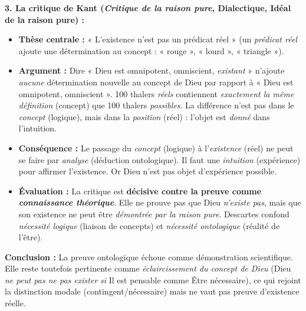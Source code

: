 \documentclass[11pt]{article}
\newcommand{\cle}[1]{{\popxbold\color{popdark}#1}}
\begin{document}
\begin{exoresolu}
\textbf{3. La critique de Kant (\emph{Critique de la raison pure}, Dialectique, Idéal de la raison pure) :}
\begin{itemize}
    \item \textbf{Thèse centrale :} « \cle{L'existence n'est pas un prédicat réel} » (un \emph{prédicat réel} ajoute une détermination au concept : « rouge », « lourd », « triangle »).
    \item \textbf{Argument :} Dire « Dieu est omnipotent, omniscient, \emph{existant} » n'ajoute \emph{aucune} détermination nouvelle au concept de Dieu par rapport à « Dieu est omnipotent, omniscient ». 100 thalers \emph{réels} contiennent \emph{exactement la même définition} (concept) que 100 thalers \emph{possibles}. La différence n'est pas dans le \emph{concept} (logique), mais dans la \emph{position} (réel) : l'objet est \emph{donné} dans l'intuition.
    \item \textbf{Conséquence :} Le passage du \emph{concept} (logique) à l'\emph{existence} (réel) ne peut se faire par \emph{analyse} (déduction ontologique). Il faut une \emph{intuition} (expérience) pour affirmer l'existence. Or Dieu n'est pas objet d'expérience possible.
    \item \textbf{Évaluation :} La critique est \textbf{décisive contre la preuve comme \emph{connaissance théorique}}. Elle ne prouve pas que Dieu \emph{n'existe pas}, mais que son existence ne peut être \emph{démontrée par la raison pure}. Descartes confond \emph{nécessité logique} (liaison de concepts) et \emph{nécessité ontologique} (réalité de l'être).
\end{itemize}

\textbf{Conclusion :} La preuve ontologique échoue comme démonstration scientifique. Elle reste toutefois pertinente comme \emph{éclaircissement du concept de Dieu} (Dieu \emph{ne peut pas ne pas exister} \emph{si} Il est pensable comme Être nécessaire), ce qui rejoint la distinction modale (contingent/nécessaire) mais ne vaut pas preuve d'existence réelle.
\end{exoresolu}
\end{document}
